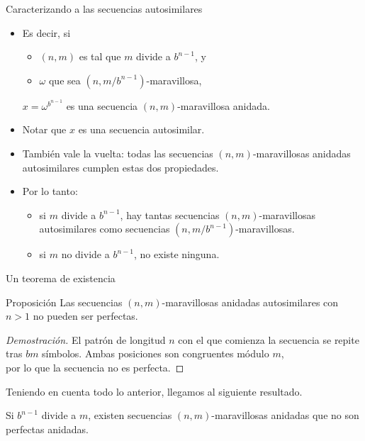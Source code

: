\documentclass[spanish,xcolor={table}]{beamer}
\begin{document}
\begin{frame}{Caracterizando a las secuencias autosimilares}

  \begin{itemize}
    \item Es decir, si
    \begin{itemize}
      \item $(n,m)$ es tal que $m$ divide a $b^{n-1}$, y
      \item $\omega$ que sea $(n, m/b^{n-1})$-maravillosa,
    \end{itemize}
    $x = \omega^{b^{n-1}}$ es una secuencia $(n,m)$-maravillosa anidada.
    \item Notar que $x$ es una secuencia autosimilar.
    \pause
    \item También vale la vuelta: todas las secuencias $(n,m)$-maravillosas
    anidadas autosimilares cumplen estas dos propiedades.
    \pause
    \item Por lo tanto:
    \begin{itemize}
      \item si $m$ divide a $b^{n-1}$, hay tantas secuencias
      $(n,m)$-maravillosas autosimilares como secuencias $(n, m/b^{n-1})$-maravillosas.
      \item si $m$ no divide a $b^{n-1}$, no existe ninguna.
    \end{itemize}
    
  \end{itemize}
  
  \end{frame}


\begin{frame}{Un teorema de existencia}

  \begin{block}{Proposición}
    Las secuencias $(n,m)$-maravillosas anidadas autosimilares
    con $n > 1$ no pueden ser perfectas.
  \end{block}
  \pause

  \begin{proof}[Demostración\nopunct]
    El patrón de longitud $n$ con el que comienza la secuencia se repite tras $bm$ símbolos. Ambas posiciones son congruentes módulo $m$, \\
    por lo que la secuencia no es perfecta.
  \end{proof}
  \pause

  \bigskip

  Teniendo en cuenta todo lo anterior, llegamos al siguiente resultado.

  \begin{theorem}
    Si $b^{n-1}$ divide a $m$, existen secuencias $(n,m)$-maravillosas anidadas
    que no son perfectas anidadas.
  \end{theorem}
  
  \end{frame}
\end{document}
